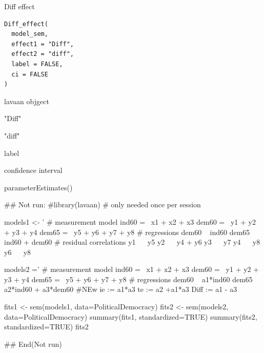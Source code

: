 \documentclass[a4paper]{book}
\begin{document}
%
\begin{Description}
Diff effect
\end{Description}
%
\begin{Usage}
\begin{verbatim}
Diff_effect(
  model_sem,
  effect1 = "Diff",
  effect2 = "diff",
  label = FALSE,
  ci = FALSE
)
\end{verbatim}
\end{Usage}
%
\begin{Arguments}
\begin{ldescription}
\item[\code{model\_sem}] lavaan objgect

\item[\code{effect1}] "Diff"

\item[\code{effect2}] "diff"

\item[\code{label}] label

\item[\code{ci}] confidence interval
\end{ldescription}
\end{Arguments}
%
\begin{Value}
parameterEstimates()
\end{Value}
%
\begin{Examples}
\begin{ExampleCode}

\#\# Not run: 
#library(lavaan) # only needed once per session

models1 <- '
  # measurement model
    ind60 =~ x1 + x2 + x3
    dem60 =~ y1 + y2 + y3 + y4
    dem65 =~ y5 + y6 + y7 + y8
    # regressions
    dem60 ~ ind60
    dem65 ~ ind60 + dem60
      # residual correlations
    y1 ~~ y5
    y2 ~~ y4 + y6
    y3 ~~ y7
    y4 ~~ y8
    y6 ~~ y8

models2 ='
  # measurement model
    ind60 =~ x1 + x2 + x3
    dem60 =~ y1 + y2 + y3 + y4
    dem65 =~ y5 + y6 + y7 + y8
     # regressions
    dem60 ~ a1*ind60
    dem65 ~ a2*ind60 + a3*dem60
 #NEw
   ie := a1*a3
   te := a2 +a1*a3
   Diff := a1 - a3




fits1 <- sem(models1, data=PoliticalDemocracy)
fits2 <- sem(models2, data=PoliticalDemocracy)
summary(fits1, standardized=TRUE)
summary(fits2, standardized=TRUE)
fits2 %

## End(Not run)
\end{ExampleCode}
\end{Examples}
\end{document}
